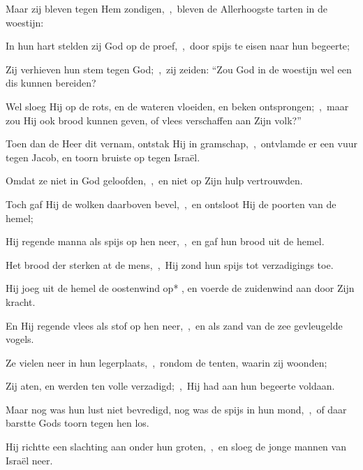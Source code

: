 \documentclass[12pt,twoside,a5paper]{article}
\begin{document}

\begin{halfparskip}
  Maar zij bleven tegen Hem zondigen,~\sep\ bleven de Allerhoogste tarten in de woestijn:

  In hun hart stelden zij God op de proef,~\sep\ door spijs te eisen naar hun begeerte;

  Zij verhieven hun stem tegen God;~\sep\ zij zeiden: ``Zou God in de woestijn wel een dis kunnen bereiden?

  Wel sloeg Hij op de rots, en de wateren vloeiden, en beken ontsprongen;~\sep\ maar zou Hij ook brood kunnen geven, of vlees verschaffen aan Zijn volk?''

  Toen dan de Heer dit vernam, ontstak Hij in gramschap,~\sep\ ontvlamde er een vuur tegen Jacob, en toorn bruiste op tegen Israël.

  Omdat ze niet in God geloofden,~\sep\ en niet op Zijn hulp vertrouwden.

  Toch gaf Hij de wolken daarboven bevel,~\sep\ en ontsloot Hij de poorten van de hemel;

  Hij regende manna als spijs op hen neer,~\sep\ en gaf hun brood uit de hemel.

  Het brood der sterken at de mens,~\sep\ Hij zond hun spijs tot verzadigings toe.

  Hij joeg uit de hemel de oostenwind op* , en voerde de zuidenwind aan door Zijn kracht.

  En Hij regende vlees als stof op hen neer,~\sep\ en als zand van de zee gevleugelde vogels.

  Ze vielen neer in hun legerplaats,~\sep\ rondom de tenten, waarin zij woonden;

  Zij aten, en werden ten volle verzadigd;~\sep\ Hij had aan hun begeerte voldaan.

  Maar nog was hun lust niet bevredigd, nog was de spijs in hun mond,~\sep\ of daar barstte Gods toorn tegen hen los.

  Hij richtte een slachting aan onder hun groten,~\sep\ en sloeg de jonge mannen van Israël neer.
\end{halfparskip}

\end{document}
